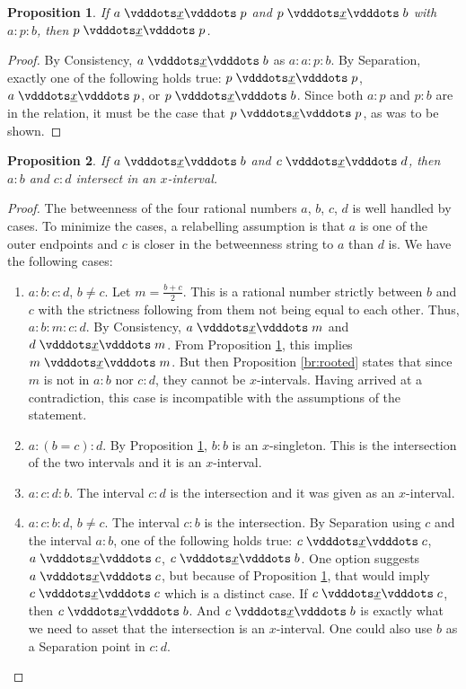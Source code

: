\documentclass[12pt]{article}
\newtheorem{proposition}{Proposition}[section]
\begin{document}
\begin{proposition}\label{br:endpointed}
    If $a \xrel p$ and $p \xrel b$ with $a:p:b$, then $p \xrel p$.
\end{proposition}

\begin{proof}
    By Consistency, $a \xrel b$ as $a:a:p:b$.  By Separation, exactly one of the following holds true: $p \xrel p$,  \sout{$a \xrel p$}, or \sout{$p \xrel b$}. Since both $a:p$ and $p:b$ are in the relation, it must be the case that $p \xrel p$, as was to be shown. 
\end{proof}


\begin{proposition}\label{br:intersect}
    If $a \xrel b$ and $c \xrel d$, then $a:b$ and $c:d$ intersect in an $x$-interval. 
\end{proposition}

\begin{proof}
    The betweenness of the four rational numbers $a$, $b$, $c$, $d$ is well handled by cases. To minimize the cases, a relabelling assumption is that $a$ is one of the outer endpoints and $c$ is closer in the betweenness string to $a$ than $d$ is. We have the following cases: 

    \begin{enumerate}
        \item $a:b:c:d$, $b \neq c$. Let $m = \frac{b+c}{2}$. This is a rational number strictly between $b$ and $c$ with the strictness following from them not being equal to each other. Thus, $a:b:m:c:d$. By Consistency, $a\xrel m$ and $d \xrel m$. From Proposition \ref{br:endpointed}, this implies $m \xrel m$. But then Proposition \ref{br:rooted} states that since $m$ is not in $a:b$ nor $c:d$, they cannot be $x$-intervals. Having arrived at a contradiction, this case is incompatible with the assumptions of the statement. 
        \item $a:(b=c):d$. By Proposition \ref{br:endpointed}, $b:b$ is an $x$-singleton. This is the intersection of the two intervals and it is an $x$-interval. 
        \item $a:c:d:b$. The interval $c:d$ is the intersection and it was given as an $x$-interval. 
        \item $a:c:b:d$, $b \neq c$. The interval $c:b$ is the intersection. By Separation using $c$ and the interval $a:b$, one of the following holds true: $c \xrel c$, $a \xrel c$, $c \xrel b$. One option suggests $a \xrel c$, but because of Proposition \ref{br:endpointed}, that would imply $ c \xrel c$ which is a distinct case. If $c \xrel c$, then $c \xrel b$. And $c \xrel b$ is exactly what we need to asset that the intersection is an $x$-interval. One could also use $b$ as a Separation point in $c:d$. 
    \end{enumerate}
\end{proof}
\end{document}
